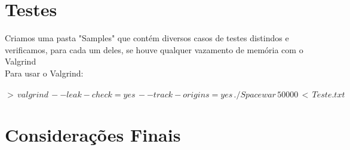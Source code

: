 \documentclass{article}
\begin{document}
\section{Testes}
Criamos uma pasta "Samples" que contém diversos casos de testes distindos e verificamos, para cada um deles, se houve qualquer vazamento de memória com o Valgrind \\
Para usar o Valgrind: 
\\ \\
\indent $>\,valgrind\,--leak-check=yes\,--track-origins=yes\,./Spacewar\,50000\,<\,Teste.txt$

\section{Considerações Finais}
\end{document}
